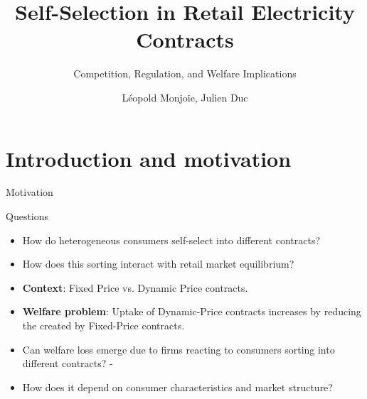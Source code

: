 \documentclass{class}
\title{Self-Selection in Retail Electricity Contracts}
\subtitle{Competition, Regulation, and Welfare Implications}
\author{Léopold Monjoie, Julien Duc}
\institute{Aalto University \and Nantes University}
\begin{document}
\newlength{\tempb}

\frame{\titlepage}

\newcommand{\commentedbox}[2]{%
  \mbox{
    \begin{tabular}[t]{@{}c@{}}
    $\boxed{\displaystyle#1}$\\
    #2
    \end{tabular}%
  }%
}

\newcommand\Wider[2][3em]{%
\makebox[\linewidth][c]{%
  \begin{minipage}{\dimexpr\textwidth+#1\relax}
  \raggedright#2
  \end{minipage}%
  }%
}

\newcommand*\circled[1]{\tikz[baseline=(char.base)]{
            \node[shape=circle,draw,inner sep=2pt] (char) {#1};}}



\section{Introduction and motivation}

\begin{frame}{Motivation}\label{Motivations}

\begin{mainbox}{Questions}
\begin{itemize}
\vspace{0.15 cm}
    \item  How do heterogeneous consumers self-select into different contracts?
        \vspace{0.15 cm}
    \item How does this sorting interact with retail market equilibrium?
    \vspace{0.15 cm}
\end{itemize}
\end{mainbox}

\vfill

\begin{itemize}    

    \item \textbf{Context}: Fixed Price vs. Dynamic Price contracts. 

    \vfill
   
    \item \textbf{Welfare problem}: Uptake of Dynamic-Price contracts increases  by reducing the  created by Fixed-Price contracts. \vfill
    
    \item Can welfare loss emerge due to firms reacting to consumers sorting into different contracts? - 
    
    \vfill

    \item How does it depend on consumer characteristics and market structure? 
\end{itemize}

       
\end{frame}
\end{document}
